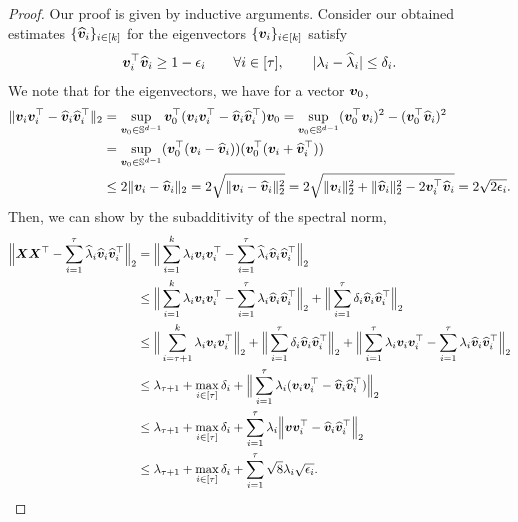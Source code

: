     \begin{proof}
    Our proof is given by inductive arguments. Consider our obtained estimates $\{\widehat{\boldsymbol{v}}_i\}_{i\in[k]}$ for the eigenvectors $\{\boldsymbol{v}_i\}_{i\in[k]}$ satisfy
    \begin{align*}
        \boldsymbol{v}_i^\top\widehat{\boldsymbol{v}}_i\geq 1-\epsilon_i\qquad \forall i\in[\tau],\qquad|\lambda_i-\widehat{\lambda}_i|\leq\delta_i.
    \end{align*}
    We note that for the eigenvectors, we have for a vector $\boldsymbol{v}_0$,
    \begin{align*}
        \Vert\boldsymbol{v}_i\boldsymbol{v}_i^\top-\widehat{\boldsymbol{v}}_i\widehat{\boldsymbol{v}}_i^\top\Vert_2&=\sup_{\boldsymbol{v}_0\in\mathbb{S}^{d-1}}\boldsymbol{v}_0^\top(\boldsymbol{v}_i\boldsymbol{v}_i^\top-\widehat{\boldsymbol{v}}_i\widehat{\boldsymbol{v}}_i^\top)\boldsymbol{v}_0=\sup_{\boldsymbol{v}_0\in\mathbb{S}^{d-1}}(\boldsymbol{v}_0^\top\boldsymbol{v}_i)^2-(\boldsymbol{v}_0^\top\widehat{\boldsymbol{v}}_i)^2\\
        &=\sup_{\boldsymbol{v}_0\in\mathbb{S}^{d-1}}(\boldsymbol{v}_0^\top(\boldsymbol{v}_i-\widehat{\boldsymbol{v}}_i))(\boldsymbol{v}_0^\top(\boldsymbol{v}_i+\widehat{\boldsymbol{v}}_i^\top))\\
        &\leq 2\Vert\boldsymbol{v}_i-\widehat{\boldsymbol{v}}_i\Vert_2=2\sqrt{\Vert\boldsymbol{v}_i-\widehat{\boldsymbol{v}}_i\Vert_2^2} = 2\sqrt{\Vert\boldsymbol{v}_i\Vert_2^2+\Vert\widehat{\boldsymbol{v}}_i\Vert_2^2-2\boldsymbol{v}_i^\top\widehat{\boldsymbol{v}}_i} = 2\sqrt{2\epsilon_i}.
    \end{align*}
    Then, we can show by the subadditivity of the spectral norm,
    \begin{align*}
        \Big\Vert\bfa X\bfa X^\top-\sum_{i=1}^\tau\wh\lambda_i\wha v_i\wha v_i^\top\Big\Vert_2&=\Big\Vert\sum_{i=1}^k\lambda_i\bfa v_i\bfa v_i^\top-\sum_{i=1}^{\tau}\wh\lambda_i\wha v_i\wha v_i^\top\Big\Vert_2\\
        &\leq\Big\Vert\sum_{i=1}^k\lambda_i\bfa v_i\bfa v_i^\top-\sum_{i=1}^\tau\lambda_i\wha v_i\wha v_i^\top\Big\Vert_2+\Big\Vert\sum_{i=1}^{\tau}\delta_i\wha v_i\wha v_i^\top\Big\Vert_2\\
        &\leq\Big\Vert\sum_{i=\tau+1}^k\lambda_i\bfa v_i\bfa v_i^\top\Big\Vert_2+\Big\Vert\sum_{i=1}^\tau\delta_i\wha v_i\wha v_i^\top\Big\Vert_2+\Big\Vert\sum_{i=1}^{\tau}\lambda_i\bfa v_i\bfa v_i^\top-\sum_{i=1}^{\tau}\lambda_i\wha v_i\wha v_i^\top \Big\Vert_2\\
        &\leq\lambda_{\tau+1} + \max_{i\in[\tau]}\delta_i+ \Big\Vert\sum_{i=1}^{\tau}\lambda_i(\bfa v_i\bfa v_i^\top-\wha v_i\wha v_i^\top)\Big\Vert_2 \\
        &\leq\lambda_{\tau+1}+\max_{i\in[\tau]}\delta_i+\sum_{i=1}^{\tau}\lambda_i\Big\Vert\bfa v\bfa v_i^\top-\wha v_i\wha v_i^\top\Big\Vert_2\\
        &\leq\lambda_{\tau+1}+\max_{i\in[\tau]}\delta_i+\sum_{i=1}^{\tau}\sqrt{8}\lambda_i\sqrt{\epsilon_i}.

\end{align*}
\end{proof}
